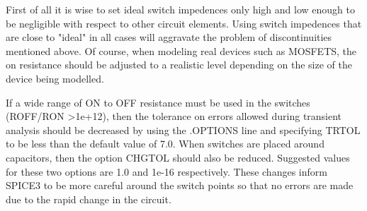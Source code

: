 First of all it is wise to set ideal switch  impedences
only  high  and  low enough to be negligible with respect to
other circuit elements.  Using switch  impedences  that  are
close  to "ideal" in all cases will aggravate the problem of
discontinuities mentioned above.  Of course,  when  modeling
real  devices  such  as MOSFETS, the on resistance should be
adjusted to a realistic level depending on the size  of  the
device being modelled.

If a wide range of ON to OFF resistance must be used in
the switches (ROFF/RON >1e+12), then the tolerance on errors
allowed during transient analysis  should  be  decreased  by
using the .OPTIONS line and specifying TRTOL to be less than
the default value of 7.0.  When switches are  placed  around
capacitors,  then  the option CHGTOL should also be reduced.
Suggested values for these two options  are  1.0  and  1e-16
respectively.   These changes inform SPICE3 to be more careful
around the switch points so that no errors are made  due
to the rapid change in the circuit.

